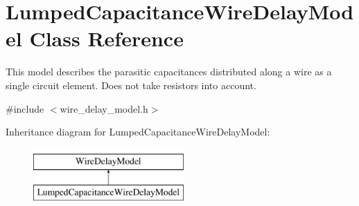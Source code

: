\hypertarget{classLumpedCapacitanceWireDelayModel}{\section{Lumped\-Capacitance\-Wire\-Delay\-Model Class Reference}
\label{classLumpedCapacitanceWireDelayModel}
}


This model describes the parasitic capacitances distributed along a wire as a single circuit element. Does not take resistors into account.  




{\ttfamily \#include $<$wire\-\_\-delay\-\_\-model.\-h$>$}

Inheritance diagram for Lumped\-Capacitance\-Wire\-Delay\-Model\-:\begin{figure}[H]
\begin{center}
\leavevmode
\includegraphics[height=2.000000cm]{classLumpedCapacitanceWireDelayModel}
\end{center}
\end{figure}
